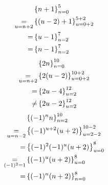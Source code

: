 


\begin{align*}
  &\left\{ n+1 \right \}^5_{n=0}\\
  \underset{u=n+2}=&\left\{ (u-2)+1 \right \}^{5+2}_{u=0+2}\\
  =&\left\{ u-1 \right \}^7_{u=2}\\
  =&\left\{ n-1 \right \}^7_{n=2}\\
\end{align*}
\begin{align*}
  &\left\{ 2n \right \}_{n=0}^{10}\\
  \underset{u=n+2}=&\left\{ 2(u-2) \right \}_{u=0+2}^{10+2}\\
  =&\left\{ 2u-4 \right \}_{u=2}^{12}\\
  \neq &\left\{ 2u-2 \right \}_{u=2}^{12}\\
\end{align*}
\begin{align*}
  &\left\{ (-1)^n n \right \}^{10}_{n=2}\\
  \underset{u=n-2}=&\left\{ (-1)^{u+2} (u+2) \right \}^{10-2}_{u=2-2}\\
  =&\left\{ (-1)^2(-1)^{u} (u+2) \right \}^{8}_{u=0}\\
  \underset{(-1)^2=1}=&\left\{ (-1)^{u} (u+2) \right \}^{8}_{u=0}\\
  =&\left\{ (-1)^{n} (n+2) \right \}^{8}_{n=0}\\
\end{align*}



